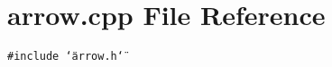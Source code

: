\section{arrow.cpp File Reference}
\label{arrow_8cpp}
{\tt \#include \char`\"{}arrow.h\char`\"{}}\par
